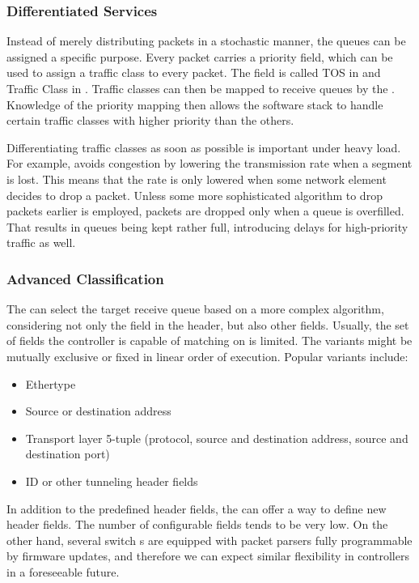 \subsubsection{Differentiated Services}

Instead of merely distributing packets in a stochastic manner, the queues can be
assigned a specific purpose. Every  packet carries a priority field,
which can be used to assign a traffic class to every packet. The field is called
\acrfull{TOS} in  and Traffic Class in . Traffic classes can
then be mapped to receive queues by the . Knowledge of the priority
mapping then allows the software stack to handle certain traffic classes with higher
priority than the others.

Differentiating traffic classes as soon as possible is important under heavy load. For
example,  avoids congestion by lowering the transmission rate when a segment is lost.
This means that the rate is only lowered when some network element decides to drop
a packet. Unless some more sophisticated algorithm to drop packets earlier is
employed, packets are dropped only when a queue is overfilled. That results in
queues being kept rather full, introducing delays for high-priority traffic as
well.

\subsubsection{Advanced Classification}
\label{offload:classification}

The  can select the target receive queue based on a more complex
algorithm, considering not only the  field in the  header, but
also other fields. Usually, the set of fields the controller is capable of
matching on is limited. The variants might be mutually exclusive or fixed in
linear order of execution. Popular variants include:

\begin{itemize}
	\item Ethertype
	\item Source or destination  address
	\item Transport layer 5-tuple (protocol, source and destination address,
	      source and destination port)
	\item {} ID or other tunneling header fields
\end{itemize}

In addition to the predefined header fields, the  can offer a way to define
new header fields. The number of configurable fields tends to be very low. On the
other hand, several switch s are equipped with packet parsers fully
programmable by firmware updates, and therefore we can expect similar
flexibility in  controllers in a foreseeable future.

